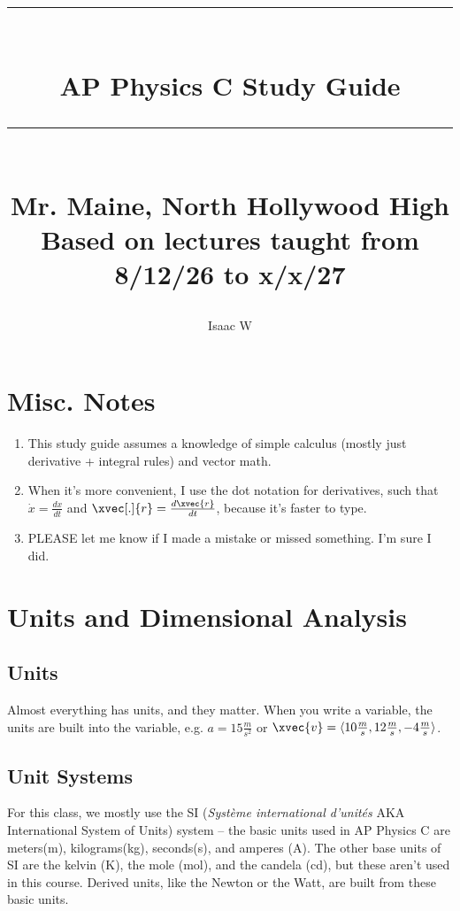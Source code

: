 \documentclass{article}
\newcommand{\HRule}[1]{\rule{\linewidth}{#1}}
\begin{document}
\title{
    \normalsize \textsc{}
    \\ [2.0cm]
    \HRule{1.5pt} \\
    \Large \textbf{AP Physics C Study Guide} \\
    \HRule{1.5pt} \\
    \Large{Mr. Maine, North Hollywood High} \\
    \normalsize{Based on lectures taught from 8/12/26 to x/x/27}
}
\date{}
\author{Isaac W \smiley{}}

\maketitle
\newpage

\tableofcontents

\newpage
\section{Misc. Notes}
\begin{enumerate}
    \item
        This study guide assumes a knowledge of simple calculus (mostly just derivative + integral rules) and vector math.
    \item
        When it's more convenient, I use the dot notation for derivatives, such that $\dot{x}=\frac{dx}{dt}$ and $\xvec[.]{r}=\frac{d\xvec{r}}{dt}$, because it's faster to type.
    \item
        PLEASE let me know if I made a mistake or missed something. I'm sure I did.
\end{enumerate}

\newpage

\section{Units and Dimensional Analysis}

\subsection{Units}
Almost everything has units, and they matter.
When you write a variable, the units are built into the variable, e.g. $ a = 15 \frac{m}{s^2} $ or $ \xvec{v} = \langle 10 \frac{m}{s}, 12 \frac{m}{s}, -4 \frac{m}{s} \rangle $.

\subsection{Unit Systems}
For this class, we mostly use the SI (\textit{Système international d'unités} AKA International System of Units) system -- the basic units used in AP Physics C are meters(m), kilograms(kg), seconds(s), and amperes (A). The other base
units of SI are the kelvin (K), the mole (mol), and the candela (cd), but these aren't used in this course.
Derived units, like the Newton or the Watt, are built from these basic units.
\end{document}
